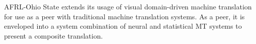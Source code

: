 AFRL-Ohio State extends its usage of visual domain-driven machine translation for use as a peer with traditional machine translation systems. As a peer, it is enveloped into a system combination of neural and statistical MT systems to present a composite translation.
